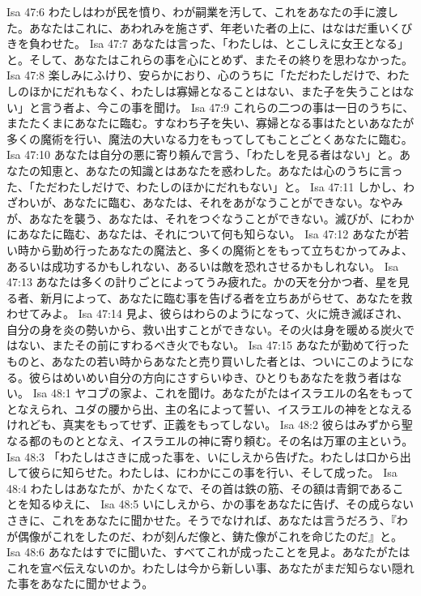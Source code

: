 Isa 47:6  わたしはわが民を憤り、わが嗣業を汚して、これをあなたの手に渡した。あなたはこれに、あわれみを施さず、年老いた者の上に、はなはだ重いくびきを負わせた。
Isa 47:7  あなたは言った、「わたしは、とこしえに女王となる」と。そして、あなたはこれらの事を心にとめず、またその終りを思わなかった。
Isa 47:8  楽しみにふけり、安らかにおり、心のうちに「ただわたしだけで、わたしのほかにだれもなく、わたしは寡婦となることはない、また子を失うことはない」と言う者よ、今この事を聞け。
Isa 47:9  これらの二つの事は一日のうちに、またたくまにあなたに臨む。すなわち子を失い、寡婦となる事はたといあなたが多くの魔術を行い、魔法の大いなる力をもってしてもことごとくあなたに臨む。
Isa 47:10  あなたは自分の悪に寄り頼んで言う、「わたしを見る者はない」と。あなたの知恵と、あなたの知識とはあなたを惑わした。あなたは心のうちに言った、「ただわたしだけで、わたしのほかにだれもない」と。
Isa 47:11  しかし、わざわいが、あなたに臨む、あなたは、それをあがなうことができない。なやみが、あなたを襲う、あなたは、それをつぐなうことができない。滅びが、にわかにあなたに臨む、あなたは、それについて何も知らない。
Isa 47:12  あなたが若い時から勤め行ったあなたの魔法と、多くの魔術とをもって立ちむかってみよ、あるいは成功するかもしれない、あるいは敵を恐れさせるかもしれない。
Isa 47:13  あなたは多くの計りごとによってうみ疲れた。かの天を分かつ者、星を見る者、新月によって、あなたに臨む事を告げる者を立ちあがらせて、あなたを救わせてみよ。
Isa 47:14  見よ、彼らはわらのようになって、火に焼き滅ぼされ、自分の身を炎の勢いから、救い出すことができない。その火は身を暖める炭火ではない、またその前にすわるべき火でもない。
Isa 47:15  あなたが勤めて行ったものと、あなたの若い時からあなたと売り買いした者とは、ついにこのようになる。彼らはめいめい自分の方向にさすらいゆき、ひとりもあなたを救う者はない。
Isa 48:1  ヤコブの家よ、これを聞け。あなたがたはイスラエルの名をもってとなえられ、ユダの腰から出、主の名によって誓い、イスラエルの神をとなえるけれども、真実をもってせず、正義をもってしない。
Isa 48:2  彼らはみずから聖なる都のものととなえ、イスラエルの神に寄り頼む。その名は万軍の主という。
Isa 48:3  「わたしはさきに成った事を、いにしえから告げた。わたしは口から出して彼らに知らせた。わたしは、にわかにこの事を行い、そして成った。
Isa 48:4  わたしはあなたが、かたくなで、その首は鉄の筋、その額は青銅であることを知るゆえに、
Isa 48:5  いにしえから、かの事をあなたに告げ、その成らないさきに、これをあなたに聞かせた。そうでなければ、あなたは言うだろう、『わが偶像がこれをしたのだ、わが刻んだ像と、鋳た像がこれを命じたのだ』と。
Isa 48:6  あなたはすでに聞いた、すべてこれが成ったことを見よ。あなたがたはこれを宣べ伝えないのか。わたしは今から新しい事、あなたがまだ知らない隠れた事をあなたに聞かせよう。
